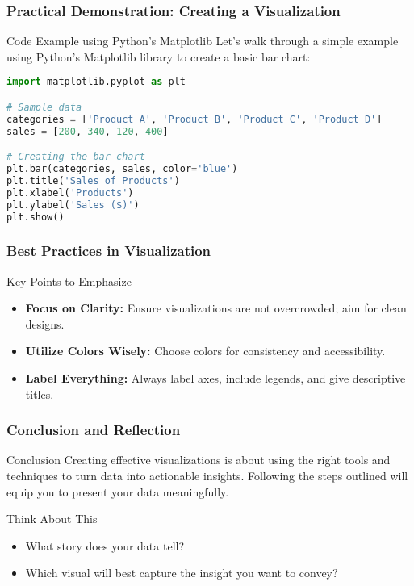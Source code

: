 \documentclass[aspectratio=169]{beamer}
\begin{document}
\begin{frame}[fragile]
    \frametitle{Practical Demonstration: Creating a Visualization}

    \begin{block}{Code Example using Python's Matplotlib}
    Let's walk through a simple example using Python's Matplotlib library to create a basic bar chart:
    \end{block}

    \begin{lstlisting}[language=Python]
import matplotlib.pyplot as plt

# Sample data
categories = ['Product A', 'Product B', 'Product C', 'Product D']
sales = [200, 340, 120, 400]

# Creating the bar chart
plt.bar(categories, sales, color='blue')
plt.title('Sales of Products')
plt.xlabel('Products')
plt.ylabel('Sales ($)')
plt.show()
    \end{lstlisting}
\end{frame}

\begin{frame}
    \frametitle{Best Practices in Visualization}

    \begin{block}{Key Points to Emphasize}
        \begin{itemize}
            \item \textbf{Focus on Clarity:} Ensure visualizations are not overcrowded; aim for clean designs.
            \item \textbf{Utilize Colors Wisely:} Choose colors for consistency and accessibility.
            \item \textbf{Label Everything:} Always label axes, include legends, and give descriptive titles.
        \end{itemize}
    \end{block}
\end{frame}

\begin{frame}
    \frametitle{Conclusion and Reflection}

    \begin{block}{Conclusion}
        Creating effective visualizations is about using the right tools and techniques to turn data into actionable insights. Following the steps outlined will equip you to present your data meaningfully.
    \end{block}

    \begin{block}{Think About This}
        \begin{itemize}
            \item What story does your data tell?
            \item Which visual will best capture the insight you want to convey?
        \end{itemize}
    \end{block}
\end{frame}
\end{document}
